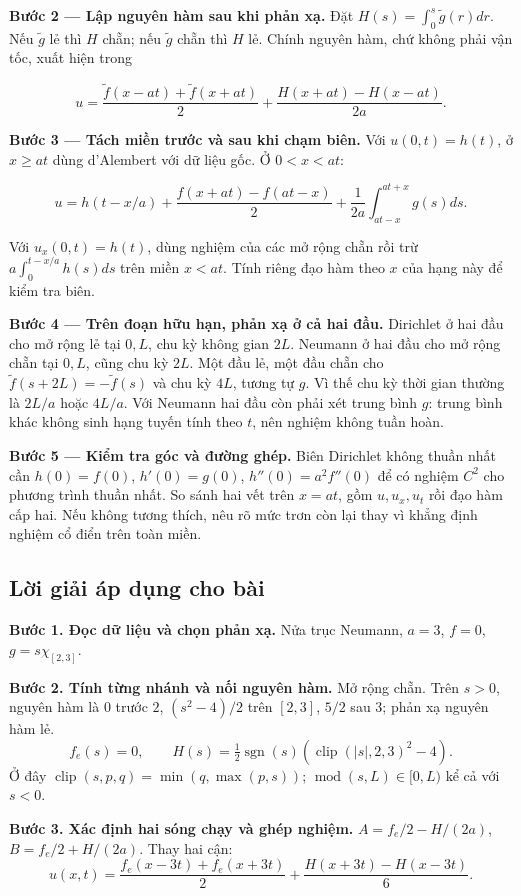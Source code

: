\documentclass[10pt,a4paper]{article}
\begin{document}
\textbf{Bước 2 — Lập nguyên hàm sau khi phản xạ.} Đặt $H(s)=\int_0^s\widetilde g(r)dr$. Nếu $\widetilde g$ lẻ thì $H$ chẵn; nếu $\widetilde g$ chẵn thì $H$ lẻ. Chính nguyên hàm, chứ không phải vận tốc, xuất hiện trong


\[
u=\frac{\widetilde f(x-at)+\widetilde f(x+at)}2+\frac{H(x+at)-H(x-at)}{2a}.
\]


\textbf{Bước 3 — Tách miền trước và sau khi chạm biên.} Với $u(0,t)=h(t)$, ở $x\ge at$ dùng d'Alembert với dữ liệu gốc. Ở $0<x<at$:


\[
u=h(t-x/a)+\frac{f(x+at)-f(at-x)}2+\frac1{2a}\int_{at-x}^{at+x}g(s)ds.
\]


Với $u_x(0,t)=h(t)$, dùng nghiệm của các mở rộng chẵn rồi trừ $a\int_0^{t-x/a}h(s)ds$ trên miền $x<at$. Tính riêng đạo hàm theo $x$ của hạng này để kiểm tra biên.

\textbf{Bước 4 — Trên đoạn hữu hạn, phản xạ ở cả hai đầu.} Dirichlet ở hai đầu cho mở rộng lẻ tại $0,L$, chu kỳ không gian $2L$. Neumann ở hai đầu cho mở rộng chẵn tại $0,L$, cũng chu kỳ $2L$. Một đầu lẻ, một đầu chẵn cho $\widetilde f(s+2L)=-\widetilde f(s)$ và chu kỳ $4L$, tương tự $g$. Vì thế chu kỳ thời gian thường là $2L/a$ hoặc $4L/a$. Với Neumann hai đầu còn phải xét trung bình $g$: trung bình khác không sinh hạng tuyến tính theo $t$, nên nghiệm không tuần hoàn.

\textbf{Bước 5 — Kiểm tra góc và đường ghép.} Biên Dirichlet không thuần nhất cần $h(0)=f(0)$, $h'(0)=g(0)$, $h''(0)=a^2f''(0)$ để có nghiệm $C^2$ cho phương trình thuần nhất. So sánh hai vết trên $x=at$, gồm $u,u_x,u_t$ rồi đạo hàm cấp hai. Nếu không tương thích, nêu rõ mức trơn còn lại thay vì khẳng định nghiệm cổ điển trên toàn miền.
\subsection*{Lời giải áp dụng cho bài}
\textbf{Bước 1. Đọc dữ liệu và chọn phản xạ.} Nửa trục Neumann, $a=3$, $f=0$, $g=s\chi_{[2,3]}$.

\textbf{Bước 2. Tính từng nhánh và nối nguyên hàm.} Mở rộng chẵn. Trên $s>0$, nguyên hàm là $0$ trước $2$, $(s^2-4)/2$ trên $[2,3]$, $5/2$ sau $3$; phản xạ nguyên hàm lẻ.
\[f_e(s)=0,\qquad H(s)=\tfrac12\operatorname{sgn}(s)(\operatorname{clip}(|s|,2,3)^2-4).\]
Ở đây $\operatorname{clip}(s,p,q)=\min(q,\max(p,s))$; $\operatorname{mod}(s,L)\in[0,L)$ kể cả với $s<0$.

\textbf{Bước 3. Xác định hai sóng chạy và ghép nghiệm.} $A=f_e/2-H/(2a)$, $B=f_e/2+H/(2a)$. Thay hai cận:
\[u(x,t)=\frac{f_e(x-3t)+f_e(x+3t)}2+\frac{H(x+3t)-H(x-3t)}{6}.\]
\end{document}
